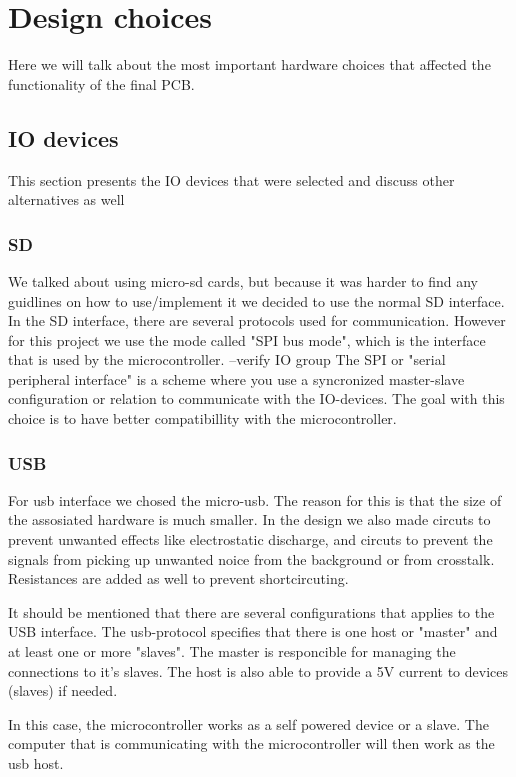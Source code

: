 \section {Design choices}

Here we will talk about the most important hardware choices that affected the functionality of the final PCB.

\subsection{IO devices} \label{pcb:design-choices:ss:IO_devices}
This section presents the IO devices that were selected and discuss other alternatives as well

\subsubsection{SD}
We talked about using micro-sd cards, but because it was harder to find any guidlines on how to use/implement it we decided to use the normal SD interface.
In the SD interface, there are several protocols used for communication. 
However for this project we use the mode called "SPI bus mode", which is the interface that is used by the microcontroller.  --verify IO group
The SPI or "serial peripheral interface" is a scheme where you use a syncronized master-slave configuration or relation to communicate with the IO-devices. 
The goal with this choice is to have better compatibillity with the microcontroller.

\subsubsection{USB}
For usb interface we chosed the micro-usb. 
The reason for this is that the size of the assosiated hardware is much smaller.
In the design we also made circuts to prevent unwanted effects like electrostatic discharge, and circuts to prevent the signals from picking up unwanted noice from the background or from crosstalk.
Resistances are added as well to prevent shortcircuting.

It should be mentioned that there are several configurations that applies to the USB interface. The usb-protocol
specifies that there is one host or "master" and at least one or more "slaves". The master is responcible for managing the connections
to it's slaves. The host is also able to provide a 5V current to devices (slaves) if needed.

In this case, the microcontroller works as a self powered device or a slave. The computer that is communicating with the microcontroller
will then work as the usb host.


